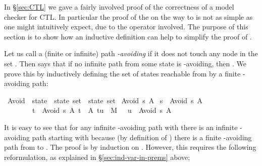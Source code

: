 %
\begin{isabellebody}%
\def\isabellecontext{CTLind}%
%
%
\begin{isamarkuptext}%
\label{sec:CTL-revisited}
In \S\ref{sec:CTL} we gave a fairly involved proof of the correctness of a
model checker for CTL. In particular the proof of the
 on the way to  is not as
simple as one might intuitively expect, due to the  operator
involved. The purpose of this section is to show how an inductive definition
can help to simplify the proof of .

Let us call a (finite or infinite) path \emph{-avoiding} if it does
not touch any node in the set . Then  says
that if no infinite path from some state  is -avoiding,
then . We prove this by inductively defining the set
 of states reachable from  by a finite -avoiding path:
\end{isamarkuptext}%
\ Avoid\ {\isacharcolon}{\isacharcolon}\ {\isachardoublequote}state\ {\isasymRightarrow}\ state\ set\ {\isasymRightarrow}\ state\ set{\isachardoublequote}\isanewline
{}\ {\isachardoublequote}Avoid\ s\ A{\isachardoublequote}\isanewline
{}\ {\isachardoublequote}s\ {\isasymin}\ Avoid\ s\ A{\isachardoublequote}\isanewline
\ \ \ \ \ \ \ {\isachardoublequote}{\isasymlbrakk}\ t\ {\isasymin}\ Avoid\ s\ A{\isacharsemicolon}\ t\ {\isasymnotin}\ A{\isacharsemicolon}\ {\isacharparenleft}t{\isacharcomma}u{\isacharparenright}\ {\isasymin}\ M\ {\isasymrbrakk}\ {\isasymLongrightarrow}\ u\ {\isasymin}\ Avoid\ s\ A{\isachardoublequote}%
\begin{isamarkuptext}%
It is easy to see that for any infinite -avoiding path 
with  there is an infinite -avoiding path
starting with  because (by definition of ) there is a
finite -avoiding path from  to .
The proof is by induction on . However,
this requires the following
reformulation, as explained in \S\ref{sec:ind-var-in-prems} above;

\end{isamarkuptext}
\end{isabellebody}

